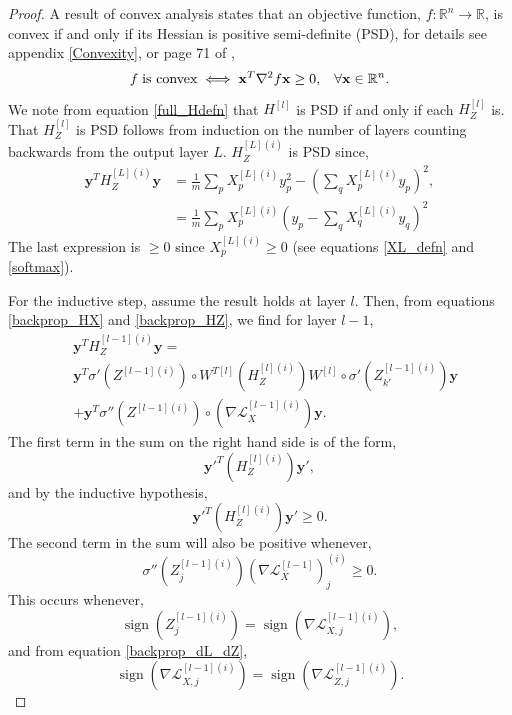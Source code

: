 \documentclass[nohyperref]{article}
\theoremstyle{plain}
\theoremstyle{definition}
\theoremstyle{remark}
\DeclareMathOperator*{\sgn}{sign}
\begin{document}
\begin{proof} 
A result of convex analysis states that an objective function, $f:\mathbb{R}^n \to \mathbb{R}$, is convex if and only if its Hessian is positive semi-definite (PSD), for details see appendix \ref{Convexity}, or page 71 of \citet{Boyd:Vanden},
\begin{equation}
f \hspace{0.1cm} \textrm{is convex} \iff \mathbf{x}^T \nabla^2 f \mathbf{x} \ge 0, \hspace{0.3cm} \forall \mathbf{x} \in \mathbb{R}^n.
\end{equation} 
We note from equation \ref{full_Hdefn} that $H^{[l]}$ is PSD if and only if each $H_Z^{[l]}$ is. That $H_Z^{[l]}$ is PSD follows from induction on the number of layers counting backwards from the output layer $L$.
$H_{Z}^{[L](i)}$ is PSD since,
\begin{align}
\mathbf{y}^T H_{Z}^{[L](i)}\mathbf{y}&=\frac{1}{m} \sum_p  X^{[L](i)}_p y_p^2 -(\sum_q X^{[L](i)}_p y_p)^2,\nonumber\\
&=\frac{1}{m} \sum_p X^{[L](i)}_p(y_p-\sum_q X^{[L](i)}_q y_q)^2
\end{align}
The last expression is $\ge 0$ since $X^{[L](i)}_p \ge 0$ (see equations \ref{XL_defn} and \ref{softmax}).

For the inductive step, assume the result holds at layer $l$. Then, from equations \ref{backprop_HX} and \ref{backprop_HZ}, we find for layer $l-1$,
\begin{align} 
 &\mathbf{y}^T H_{Z}^{[l-1](i)}\mathbf{y}=\nonumber\\
 &\mathbf{y}^T \sigma'{(Z^{[l-1](i)})}\circ W^{T[l]} (H_Z^{[l](i)})W^{[l]}\circ \sigma'{(Z_{k'}^{[l-1](i)})} \mathbf{y}\nonumber\\
 &+\mathbf{y}^{T}\sigma''{(Z^{[l-1](i)})}\circ \left(\nabla \mathcal{L}^{[l-1](i)}_{X}\right) \mathbf{y}.
 \end{align}
The first term in the sum on the right hand side is of the form,
\begin{equation}
 \mathbf{y}'^T  (H_Z^{[l](i)}) \mathbf{y}',
 \end{equation}
and by the inductive hypothesis,
\begin{equation}
 \mathbf{y}'^T  (H_Z^{[l](i)}) \mathbf{y}' \ge 0.
 \end{equation} 
 The second term in the sum will also be positive whenever,
\begin{equation}
\sigma''{(Z_j^{[l-1](i)})} \left(\nabla \mathcal{L}^{[l-1]}_{X}\right)_j^{(i)}\ge 0.
\end{equation}
This occurs whenever,
\begin{equation}
\sgn{\left(Z_j^{[l-1](i)}\right)}= \sgn{\left(\nabla \mathcal{L}^{[l-1](i)}_{X,j} \right)},
\end{equation} 
and from equation \ref{backprop_dL_dZ}, 
\begin{equation}
\sgn{\left(\nabla \mathcal{L}^{[l-1](i)}_{X,j}\right)}= \sgn{\left(\nabla \mathcal{L}^{[l-1](i)}_{Z,j} \right)}.
\end{equation}  
\end{proof}
\end{document}
